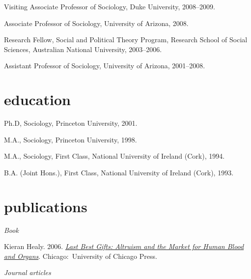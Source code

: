 \documentclass[11pt,oneside,a4paper,DIV=8]{scrartcl}
\begin{document}
Visiting Associate Professor of Sociology, Duke University, 2008--2009.

Associate Professor of Sociology, University of Arizona, 2008.

Research Fellow, Social and Political Theory Program,
Research School of Social Sciences, Australian National University, 2003--2006.

Assistant Professor of Sociology, University of Arizona, 2001--2008.



\section{education}


Ph.D, Sociology, Princeton University, 2001.\\

M.A., Sociology, Princeton University, 1998. 

%

M.A., Sociology, First Class, National University of Ireland (Cork), 1994.


B.A. (Joint Hons.), First Class, National University of Ireland (Cork), 1993.


 
\section{publications}

\noindent\emph{Book}

Kieran Healy. 2006. \emph{\href{http://www.lastbestgifts.com}{Last Best Gifts: Altruism and the Market for Human Blood and Organs}}. Chicago:~University of Chicago Press.\\



\noindent\emph{Journal articles}
 
\end{document}
